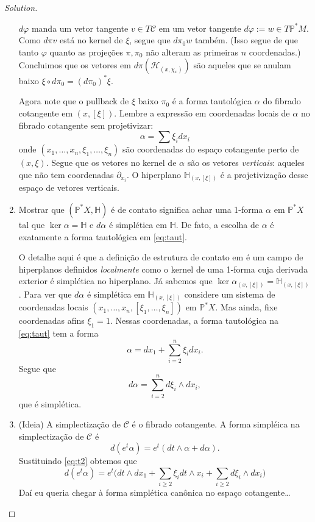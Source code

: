\begin{proof}[Solution]
\begin{enumerate}[label=(\alph*)]
	$d\varphi$ manda um vetor tangente $v\in T\mathcal{C}$
	em um vetor tangente $d\varphi:= w \in T\mathbb{P}^*M$.
	Como $d\pi v$ está no kernel de $\xi$, segue que $d\pi_0w$ também. (Isso segue de que tanto $\varphi$ quanto as projeções $\pi, \pi_0$ não alteram as primeiras $n$ coordenadas.) Concluimos que os vetores em $d\pi\left( \mathcal{H}_{(x,\chi_x)} \right) $ são aqueles que se anulam baixo $\xi \circ d\pi_0=(d\pi_0)^*\xi$.

Agora note que o pullback de $\xi$ baixo $\pi_0$ é a forma tautológica $\alpha$ do fibrado cotangente em $(x,[\xi])$. Lembre a expressão em coordenadas locais de $\alpha$ no fibrado cotangente sem projetivizar:
	\begin{equation}\label{eq:taut}\alpha=\sum \xi_i dx_i\end{equation}
	onde $(x_1,\ldots, x_n,\xi_1,\ldots,\xi_n)$ são coordenadas do espaço cotangente perto de $(x,\xi)$. Segue que os vetores no kernel de $\alpha$ são os vetores \textit{verticais}: aqueles que não tem coordenadas $\partial_{x_i}$. O hiperplano $\mathbb{H}_{(x,[\xi])}$ é a projetivização desse espaço de vetores verticais.

\item Mostrar que $(\mathbb{P}^* X,\mathbb{H})$ é de contato significa achar uma 1-forma $\alpha$ em $\mathbb{P}^*X$ tal que $\ker \alpha=\mathbb{H}$ e $d\alpha$ é simplética em $\mathbb{H}$. De fato, a escolha de $\alpha$ é exatamente a forma tautológica em \cref{eq:taut}.

	O detalhe aqui é que a definição de estrutura de contato em \cite{das} é um campo de hiperplanos definidos \textit{localmente} como o kernel de uma 1-forma cuja derivada exterior é simplética no hiperplano. Já sabemos que $\ker \alpha_{(x,[\xi])}=\mathbb{H}_{(x,[\xi])}$. Para ver que $d\alpha$ é simplética em $\mathbb{H}_{(x,[\xi])}$ considere um sistema de coordenadas locais $(x_1,\ldots,x_n,[\xi_1,\ldots,\xi_n])$ em $\mathbb{P}^*X$. Mas ainda, fixe coordenadas afins $\xi_1=1$. Nessas coordenadas, a forma tautológica na \cref{eq:taut} tem a forma
	\begin{equation}\label{eq:t2}\alpha=dx_1+\sum_{i=2}^n\xi_idx_i.\end{equation}
	Segue que
	\[d \alpha=\sum_{i=2}^nd\xi_i\wedge dx_i,\]
	que é simplética.

\item (Ideia) A simplectização de $\mathcal{C}$ é o fibrado cotangente. A forma simpléica na simplectização de $\mathcal{C}$ é
	\[d(e^t\alpha)=e^t(dt\wedge \alpha+d\alpha).\]
Sustituindo \cref{eq:t2} obtemos que
\[d(e^t\alpha)=e^t\Big(dt \wedge dx_1+ \sum_{i\geq 2} \xi_idt \wedge x_i+\sum_{i \geq 2} d \xi _i \wedge d x_i\Big) \]
Daí eu queria chegar à forma simplética canônica no espaço cotangente…
\end{enumerate}
\end{proof}

